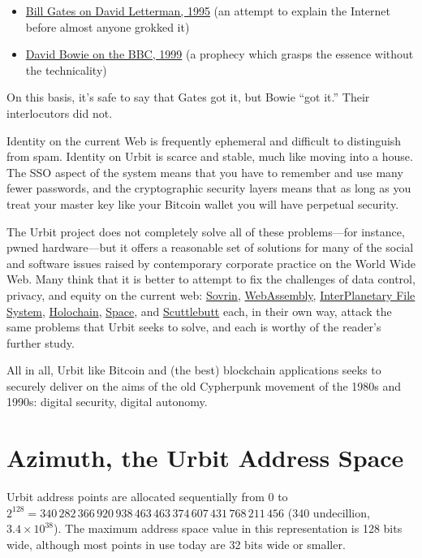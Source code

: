 {{{{\begin{itemize}
	\item  \href{https://www.youtube.com/watch?v=gipL_CEw-fk}{Bill Gates on David Letterman, 1995} (an attempt to explain the Internet before almost anyone grokked it)
	\item  \href{https://www.youtube.com/watch?v=LaHcOs7mhfU}{David Bowie on the BBC, 1999} (a prophecy which grasps the essence without the technicality)
\end{itemize}

On this basis, it's safe to say that Gates got it, but Bowie ``got it.''  Their interlocutors did not.}
Identity on the current Web is frequently ephemeral and difficult to distinguish from spam.  Identity on Urbit is scarce and stable, much like moving into a house.  The SSO aspect of the system means that you have to remember and use many fewer passwords, and the cryptographic security layers means that as long as you treat your master key like your Bitcoin wallet you will have perpetual security.

The Urbit project does not completely solve all of these problems—for instance, pwned hardware—but it offers a reasonable set of solutions for many of the social and software issues raised by contemporary corporate practice on the World Wide Web.  Many think that it is better to attempt to fix the challenges of data control, privacy, and equity on the current web: \href{https://sovrin.org/}{Sovrin}, \href{https://webassembly.org/}{WebAssembly}, \href{https://ipfs.io/}{InterPlanetary File System}, \href{https://holochain.org/}{Holochain}, \href{https://blog.space.storage/posts/Introducing-Space}{Space}, and \href{https://scuttlebutt.nz/}{Scuttlebutt} each, in their own way, attack the same problems that Urbit seeks to solve, and each is worthy of the reader's further study.

All in all, Urbit like Bitcoin and (the best) blockchain applications seeks to securely deliver on the aims of the old Cypherpunk movement of the 1980s and 1990s:  digital security, digital autonomy.


\section{Azimuth, the Urbit Address Space}

Urbit address points are allocated sequentially from $0$ to $2^{128} = 340\,282\,366\,920\,938\,463\,463\,374\,607\,431\,768\,211\,456$ (340 undecillion, $3.4 \times 10^{38}$).  The maximum address space value in this representation is 128 bits wide, although most points in use today are 32 bits wide or smaller.

}}}
